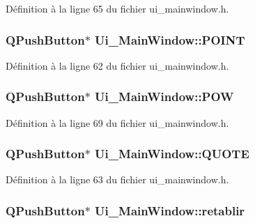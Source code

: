 \-Définition à la ligne 65 du fichier ui\-\_\-mainwindow.\-h.

\hypertarget{class_ui___main_window_afea79b7d0abfd420abade70c22e611e9}{
\subsubsection[{\-P\-O\-I\-N\-T}]{\setlength{\rightskip}{0pt plus 5cm}\-Q\-Push\-Button$\ast$ {\bf \-Ui\-\_\-\-Main\-Window\-::\-P\-O\-I\-N\-T}}}\label{class_ui___main_window_afea79b7d0abfd420abade70c22e611e9}


\-Définition à la ligne 62 du fichier ui\-\_\-mainwindow.\-h.

\hypertarget{class_ui___main_window_a02bdc78125dfec5dfb5653ce0776eeb3}{
\subsubsection[{\-P\-O\-W}]{\setlength{\rightskip}{0pt plus 5cm}\-Q\-Push\-Button$\ast$ {\bf \-Ui\-\_\-\-Main\-Window\-::\-P\-O\-W}}}\label{class_ui___main_window_a02bdc78125dfec5dfb5653ce0776eeb3}


\-Définition à la ligne 69 du fichier ui\-\_\-mainwindow.\-h.

\hypertarget{class_ui___main_window_a1e4151d33099f88be6126ffa57e3a6a8}{
\subsubsection[{\-Q\-U\-O\-T\-E}]{\setlength{\rightskip}{0pt plus 5cm}\-Q\-Push\-Button$\ast$ {\bf \-Ui\-\_\-\-Main\-Window\-::\-Q\-U\-O\-T\-E}}}\label{class_ui___main_window_a1e4151d33099f88be6126ffa57e3a6a8}


\-Définition à la ligne 63 du fichier ui\-\_\-mainwindow.\-h.

\hypertarget{class_ui___main_window_a63ba859b403fa2f74b1e5f3b3f258575}{
\subsubsection[{retablir}]{\setlength{\rightskip}{0pt plus 5cm}\-Q\-Push\-Button$\ast$ {\bf \-Ui\-\_\-\-Main\-Window\-::retablir}}}\label{class_ui___main_window_a63ba859b403fa2f74b1e5f3b3f258575}


